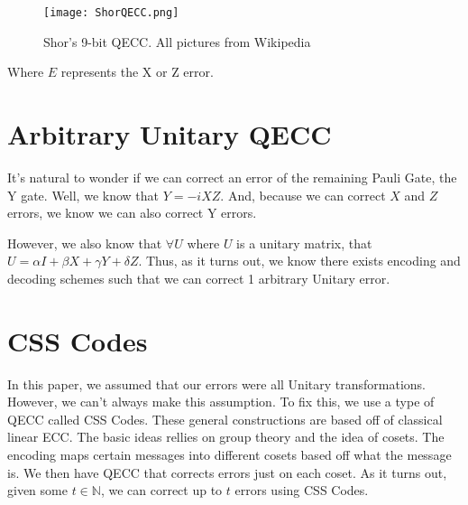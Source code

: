 \documentclass[11pt]{article}
\begin{document}
{
\begin{figure}
\centering
\texttt{[image: ShorQECC.png]}
\caption{Shor's 9-bit QECC. All pictures from Wikipedia}
\label{fig:Grammar}
\end{figure}
\par 
}

Where $E$ represents the X or Z error.

\section{Arbitrary Unitary QECC}

It's natural to wonder if we can correct an error of the remaining Pauli Gate, the Y gate. Well, we know that $Y=-iXZ$. And, because we can correct $X$ and $Z$ errors, we know we can also correct Y errors. 

However, we also know that $\forall U$ where $U$ is a unitary matrix, that $U = \alpha I + \beta X + \gamma Y + \delta Z$. Thus, as it turns out, we know there exists encoding and decoding schemes such that we can correct 1 arbitrary Unitary error.

\section{CSS Codes}
In this paper, we assumed that our errors were all Unitary transformations. However, we can't always make this assumption. To fix this, we use a type of QECC called CSS Codes. These general constructions are based off of classical linear ECC. The basic ideas rellies on group theory and the idea of cosets. The encoding maps certain messages into different cosets based off what the message is. We then have QECC that corrects errors just on each coset. As it turns out, given some $t\in\mathbb{N}$, we can correct up to $t$ errors using CSS Codes.

%
%
\end{document}
